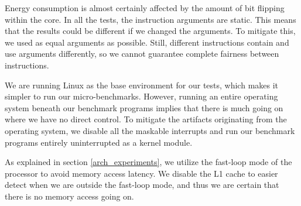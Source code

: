 Energy consumption is almost certainly affected by the amount of bit flipping
within the core. In all the tests, the instruction arguments are static. This
means that the results could be different if we changed the arguments. To
mitigate this, we used as equal arguments as possible. Still, different
instructions contain and use arguments differently, so we cannot guarantee
complete fairness between instructions.

We are running Linux as the base environment for our tests, which makes it
simpler to run our micro-benchmarks. However, running an entire operating
system beneath our benchmark programs implies that there is much going on where
we have no direct control. To mitigate the artifacts originating from
the operating system, we disable all the maskable interrupts and run our
benchmark programs entirely uninterrupted as a kernel module.

As explained in section \autoref{arch_experiments}, we utilize the fast-loop
mode of the processor to avoid memory access latency. We disable the L1 cache
to easier detect when we are outside the fast-loop mode, and thus we are
certain that there is no memory access going on.
